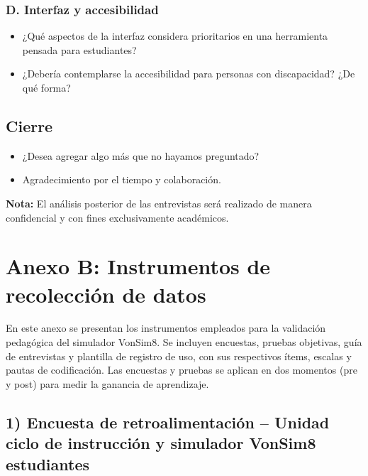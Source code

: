 \documentclass[12pt,oneside]{templates/unerthesis}
\providecommand{\tightlist}{%
  \setlength{\itemsep}{0pt}\setlength{\parskip}{0pt}}
\begin{document}
\hypertarget{d.-interfaz-y-accesibilidad}{%
\subsubsection{D. Interfaz y accesibilidad}\label{d.-interfaz-y-accesibilidad}}

\begin{itemize}
\tightlist
\item
  ¿Qué aspectos de la interfaz considera prioritarios en una herramienta pensada para estudiantes?
\item
  ¿Debería contemplarse la accesibilidad para personas con discapacidad? ¿De qué forma?
\end{itemize}

\hypertarget{cierre}{%
\subsection{Cierre}\label{cierre}}

\begin{itemize}
\tightlist
\item
  ¿Desea agregar algo más que no hayamos preguntado?
\item
  Agradecimiento por el tiempo y colaboración.
\end{itemize}

\textbf{Nota:} El análisis posterior de las entrevistas será realizado de manera confidencial y con fines exclusivamente académicos.

\hypertarget{anexoB}{%
\section{Anexo B: Instrumentos de recolección de datos}\label{anexoB}}

En este anexo se presentan los instrumentos empleados para la validación pedagógica del simulador VonSim8. Se incluyen encuestas, pruebas objetivas, guía de entrevistas y plantilla de registro de uso, con sus respectivos ítems, escalas y pautas de codificación. Las encuestas y pruebas se aplican en dos momentos (pre y post) para medir la ganancia de aprendizaje.

\hypertarget{encuesta-de-retroalimentaciuxf3n-unidad-ciclo-de-instrucciuxf3n-y-simulador-vonsim8-estudiantes}{%
\subsection{1) Encuesta de retroalimentación -- Unidad ciclo de instrucción y simulador VonSim8 estudiantes}\label{encuesta-de-retroalimentaciuxf3n-unidad-ciclo-de-instrucciuxf3n-y-simulador-vonsim8-estudiantes}}
\end{document}
